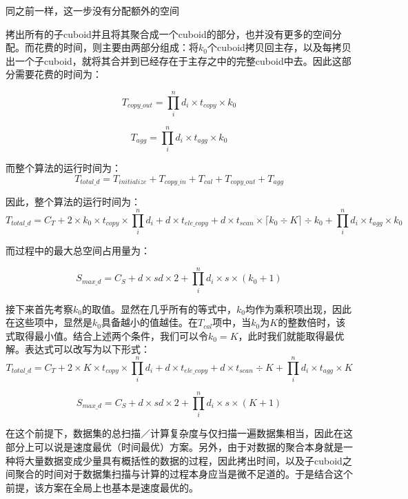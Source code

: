 同之前一样，这一步没有分配额外的空间

拷出所有的子cuboid并且将其聚合成一个cuboid的部分，也并没有更多的空间分配。而花费的时间，则主要由两部分组成：将$k_0$个cuboid拷贝回主存，以及每拷贝出一个子cuboid，就将其合并到已经存在于主存之中的完整cuboid中去。因此这部分需要花费的时间为：

\begin{equation}
T_{copy\_out} = \prod_{i}^{n} d_i \times t_{copy} \times k_0
\end{equation}

\begin{equation}
T_{agg} = \prod_{i}^{n} d_i \times t_{agg} \times k_0
\end{equation}

而整个算法的运行时间为：
\begin{equation}
T_{total\_d} = 
T_{initialize} + T_{copy\_in} + T_{cal} + T_{copy\_out} + T_{agg}
\end{equation}

因此，整个算法的运行时间为：
\begin{equation}
T_{total\_d} = C_T + 2 \times k_0 \times t_{copy} \times \prod_{i}^{n} d_i + d \times t_{ele\_copy} + d \times t_{scan} \times \lceil k_0 \div K \rceil \div k_0 + \prod_{i}^{n} d_i \times t_{agg} \times k_0
\end{equation}

而过程中的最大总空间占用量为：

\begin{equation}
S_{max\_d} = C_S + d \times sd \times 2 + \prod_{i}^{n} d_i \times s \times (k_0 + 1)
\end{equation}

接下来首先考察$k_0$的取值。显然在几乎所有的等式中，$k_0$均作为乘积项出现，因此在这些项中，显然是$k_0$具备越小的值越佳。在$T_{cal}$项中，当$k_0$为$K$的整数倍时，该式取得最小值。结合上述两个条件，我们可以令$k_0 = K$，此时我们就能取得最优解。表达式可以改写为以下形式：
\begin{equation}
T_{total\_d} = C_T + 2 \times K \times t_{copy} \times \prod_{i}^{n} d_i + d \times t_{ele\_copy} + d \times t_{scan} \div K + \prod_{i}^{n} d_i \times t_{agg} \times K
\end{equation}

\begin{equation}
S_{max\_d} = C_S + d \times sd \times 2 + \prod_{i}^{n} d_i \times s \times (K + 1)
\end{equation}

在这个前提下，数据集的总扫描／计算复杂度与仅扫描一遍数据集相当，因此在这部分上可以说是速度最优（时间最优）方案。另外，由于对数据的聚合本身就是一种将大量数据变成少量具有概括性的数据的过程，因此拷出时间，以及子cuboid之间聚合的时间对于数据集扫描与计算的过程本身应当是微不足道的。于是结合这个前提，该方案在全局上也基本是速度最优的。

